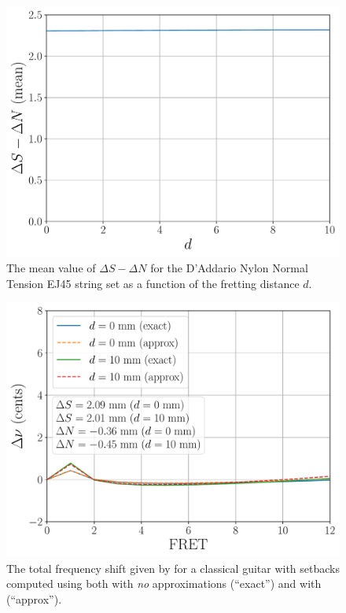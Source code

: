 \begin{figure}
  \centering
  \includegraphics[width=5.0in]{../figures/dsnd_ej45}
  \caption{\label{fig:dsnd_ej45} The mean value of $\Delta S - \Delta N$ for the D'Addario Nylon Normal Tension EJ45 string set as a function of the fretting distance $d$.}
\end{figure}

\begin{figure}
  \centering
  \includegraphics[width=5.0in]{../figures/comp_exact}
  \caption{\label{fig:comp_exact} The total frequency shift given by  for a classical guitar with setbacks computed using both  with \emph{no} approximations (``exact'') and  with  (``approx'').}
\end{figure}

